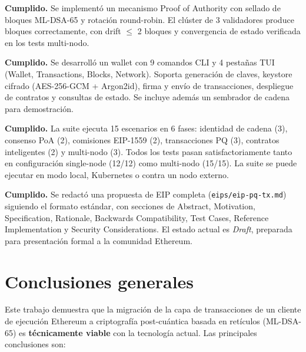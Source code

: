 \begin{description}[style=nextline, leftmargin=3em]
  \item[\textbf{OE5} --- Consenso PoA con ML-DSA-65.] \textbf{Cumplido.} Se implementó un mecanismo Proof of Authority con sellado de bloques ML-DSA-65 y rotación round-robin. El clúster de 3 validadores produce bloques correctamente, con drift $\leq$ 2 bloques y convergencia de estado verificada en los tests multi-nodo.
  
  \item[\textbf{OE6} --- Wallet PQ (CLI y TUI).] \textbf{Cumplido.} Se desarrolló un wallet con 9 comandos CLI y 4 pestañas TUI (Wallet, Transactions, Blocks, Network). Soporta generación de claves, keystore cifrado (AES-256-GCM + Argon2id), firma y envío de transacciones, despliegue de contratos y consultas de estado. Se incluye además un sembrador de cadena para demostración.
  
  \item[\textbf{OE7} --- Suite E2E.] \textbf{Cumplido.} La suite ejecuta 15 escenarios en 6 fases: identidad de cadena (3), consenso PoA (2), comisiones EIP-1559 (2), transacciones PQ (3), contratos inteligentes (2) y multi-nodo (3). Todos los tests pasan satisfactoriamente tanto en configuración single-node (12/12) como multi-nodo (15/15). La suite se puede ejecutar en modo local, Kubernetes o contra un nodo externo.
  
  \item[\textbf{OE8} --- Propuesta de EIP.] \textbf{Cumplido.} Se redactó una propuesta de EIP completa (\texttt{eips/eip-pq-tx.md}) siguiendo el formato estándar, con secciones de Abstract, Motivation, Specification, Rationale, Backwards Compatibility, Test Cases, Reference Implementation y Security Considerations. El estado actual es \emph{Draft}, preparada para presentación formal a la comunidad Ethereum.
\end{description}


\section{Conclusiones generales}
\label{sec:conclusiones_generales}

Este trabajo demuestra que la migración de la capa de transacciones de un cliente de ejecución Ethereum a criptografía post-cuántica basada en retículos (ML-DSA-65) es \textbf{técnicamente viable} con la tecnología actual. Las principales conclusiones son:

